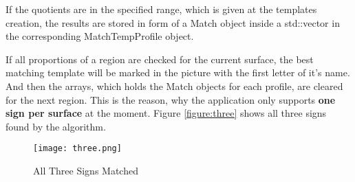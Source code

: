 If the quotients are in the specified range, which is given at the templates creation, the results 
are stored in form of a Match object inside a std::vector in the corresponding MatchTempProfile object.

If all proportions of a region are checked for the current surface, the best matching template will
be marked in the picture with the first letter of it's name. And then the arrays,
which holds the Match objects for each profile, are cleared for the next region. This is the reason, 
why the application only supports \textbf{one sign per surface} at the moment.
Figure \vref{figure:three} shows all three signs found by the algorithm.

\begin{figure}[H]
\begin{center}
  \texttt{[image: three.png]}
  \caption[]{All Three Signs Matched}
  \label{figure:three}
\end{center}
\end{figure}

